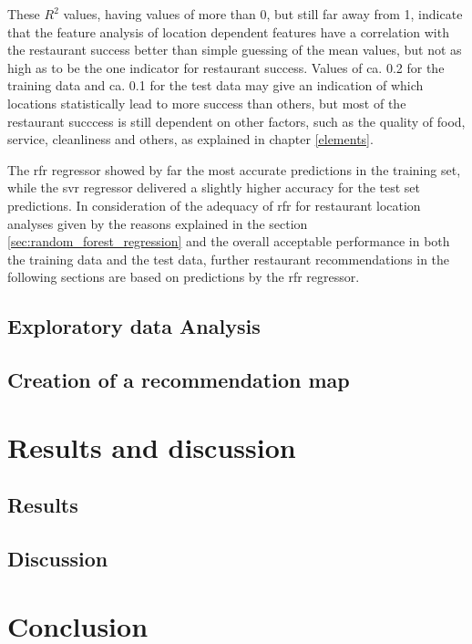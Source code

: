\documentclass[a4paper, 11pt, oneside]{Thesis}  %
\begin{document}
These $R^2$ values, having values of more than 0, but still far away from 1, indicate that the feature analysis of location dependent features have a correlation with the restaurant success better than simple guessing of the mean values, but not as high as to be the one indicator for restaurant success. Values of ca. 0.2 for the training data and ca. 0.1 for the test data may give an indication of which locations statistically lead to more success than others, but most of the restaurant succcess is still dependent on other factors, such as the quality of food, service, cleanliness and others, as explained in chapter \ref{elements}.

The \ac{rfr} regressor showed by far the most accurate predictions in the training set, while the \ac{svr} regressor delivered a slightly higher accuracy for the test set predictions. In consideration of the adequacy of \ac{rfr} for restaurant location analyses given by the reasons explained in the section \ref{sec:random_forest_regression} and the overall acceptable performance in both the training data and the test data, further restaurant recommendations in the following sections are based on predictions by the \ac{rfr} regressor.

\section{Exploratory data Analysis}

\section{Creation of a recommendation map}


\chapter{Results and discussion}

\section{Results}

\section{Discussion}

\chapter{Conclusion}
\end{document}
